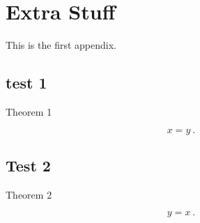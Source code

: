 \chapter{Extra Stuff}

This is the first appendix.

\section{test 1}

\begin{theo}
  Theorem 1
\end{theo}

\begin{equation}
  x = y \ .
\end{equation}

\section{Test 2}

\begin{theo}
  Theorem 2
\end{theo}

\begin{equation}
  y = x  \ .
\end{equation}


